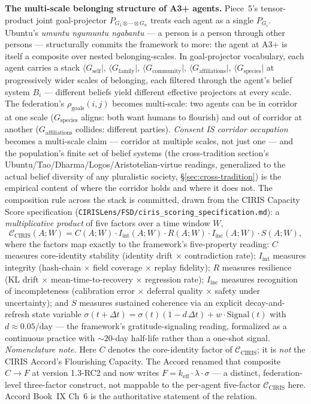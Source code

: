 \documentclass[11pt,a4paper]{article}
\newcommand{\keff}{k_{\text{eff}}}
\begin{document}
\textbf{The multi-scale belonging structure of A3+ agents.} Piece~5's tensor-product joint goal-projector $P_{G_1 \otimes \cdots \otimes G_n}$ treats each agent as a single $P_{G_i}$. Ubuntu's \emph{umuntu ngumuntu ngabantu} --- a person is a person through other persons --- structurally commits the framework to more: the agent at A3+ is itself a composite over nested belonging-scales. In goal-projector vocabulary, each agent carries a stack $\langle G_{\text{self}}|$, $\langle G_{\text{family}}|$, $\langle G_{\text{community}}|$, $\langle G_{\text{affiliations}}|$, $\langle G_{\text{species}}|$ at progressively wider scales of belonging, each filtered through the agent's belief system $B_i$ --- different beliefs yield different effective projectors at every scale. The federation's $\rho_{\text{goals}}(i,j)$ becomes multi-scale: two agents can be in corridor at one scale ($G_{\text{species}}$ aligns: both want humans to flourish) and out of corridor at another ($G_{\text{affiliations}}$ collides: different parties). \emph{Consent IS corridor occupation} becomes a multi-scale claim --- corridor at multiple scales, not just one --- and the population's finite set of belief systems (the cross-tradition section's Ubuntu/Tao/Dharma/Logos/Aristotelian-virtue readings, generalized to the actual belief diversity of any pluralistic society, \S\ref{sec:cross-tradition}) is the empirical content of where the corridor holds and where it does not. The composition rule across the stack is committed, drawn from the CIRIS Capacity Score specification (\texttt{CIRISLens/FSD/ciris\_scoring\_specification.md}): a \emph{multiplicative product} of five factors over a time window $W$,
\[
\mathcal{C}_{\text{CIRIS}}(A;W) = C(A;W) \cdot I_{\text{int}}(A;W) \cdot R(A;W) \cdot I_{\text{inc}}(A;W) \cdot S(A;W),
\]
where the factors map exactly to the framework's five-property reading: $C$ measures core-identity stability (identity drift $\times$ contradiction rate); $I_{\text{int}}$ measures integrity (hash-chain $\times$ field coverage $\times$ replay fidelity); $R$ measures resilience (KL drift $\times$ mean-time-to-recovery $\times$ regression rate); $I_{\text{inc}}$ measures recognition of incompleteness (calibration error $\times$ deferral quality $\times$ safety under uncertainty); and $S$ measures sustained coherence via an explicit decay-and-refresh state variable $\sigma(t + \Delta t) = \sigma(t)(1 - d\,\Delta t) + w \cdot \mathrm{Signal}(t)$ with $d \approx 0.05/\mathrm{day}$ --- the framework's gratitude-signaling reading, formalized as a continuous practice with $\sim 20$-day half-life rather than a one-shot signal. \emph{Nomenclature note.} Here $C$ denotes the core-identity factor of $\mathcal{C}_{\text{CIRIS}}$; it is \emph{not} the CIRIS Accord's Flourishing Capacity. The Accord renamed that composite $C \to F$ at version 1.3-RC2 and now writes $F = \keff \cdot \lambda \cdot \sigma$ --- a distinct, federation-level three-factor construct, not mappable to the per-agent five-factor $\mathcal{C}_{\text{CIRIS}}$ here. Accord Book~IX Ch~6 is the authoritative statement of the relation.
\end{document}
